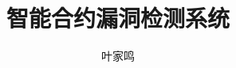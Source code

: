 \documentclass[master]{ustcthesis}
\title{智能合约漏洞检测系统}
\author{叶家鸣}
\begin{document}

%

\maketitle
\makestatement

\frontmatter

\tableofcontents
%

\mainmatter






\appendix


\backmatter


\end{document}
